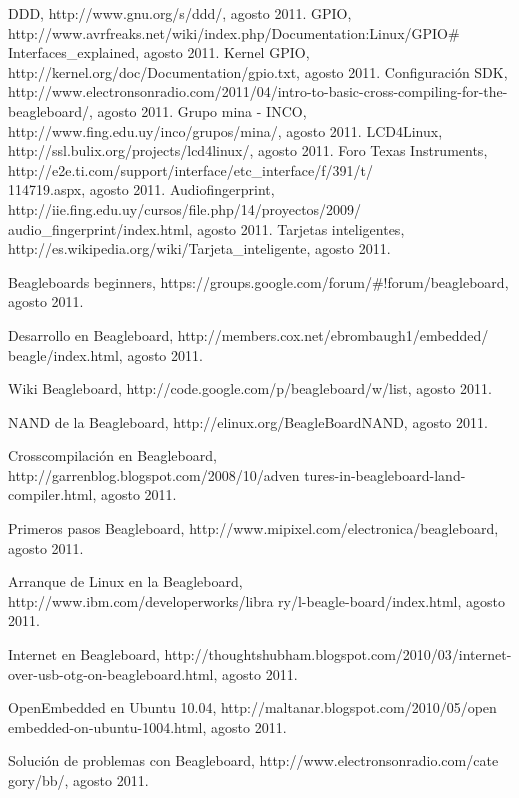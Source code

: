 \begin{thebibliography}{200}
 DDD, http://www.gnu.org/s/ddd/, agosto 2011.
 GPIO, http://www.avrfreaks.net/wiki/index.php/Documentation:Linux/GPIO\#
Interfaces\_explained, agosto 2011.
 Kernel GPIO, http://kernel.org/doc/Documentation/gpio.txt, agosto 2011.
 Configuración SDK, http://www.electronsonradio.com/2011/04/intro-to-basic-cross-compiling-for-the-beagleboard/, agosto 2011.
 Grupo mina - INCO, http://www.fing.edu.uy/inco/grupos/mina/, agosto 2011.
 LCD4Linux, http://ssl.bulix.org/projects/lcd4linux/, agosto 2011.
 Foro Texas Instruments, http://e2e.ti.com/support/interface/etc\_interface/f/391/t/\\
114719.aspx, agosto 2011.
 Audiofingerprint, http://iie.fing.edu.uy/cursos/file.php/14/proyectos/2009/\\
audio\_fingerprint/index.html, agosto 2011.
 Tarjetas inteligentes, http://es.wikipedia.org/wiki/Tarjeta\_inteligente, agosto 2011.

\bibitem{} Beagleboards beginners, https://groups.google.com/forum/\#!forum/beagleboard, agosto 2011.

\bibitem{} Desarrollo en Beagleboard, http://members.cox.net/ebrombaugh1/embedded/
beagle/index.html, agosto 2011.

\bibitem{} Wiki Beagleboard, http://code.google.com/p/beagleboard/w/list, agosto 2011.

\bibitem{} NAND de la Beagleboard, http://elinux.org/BeagleBoardNAND, agosto 2011.

\bibitem{} Crosscompilación en Beagleboard, http://garrenblog.blogspot.com/2008/10/adven
tures-in-beagleboard-land-compiler.html, agosto 2011.

\bibitem{} Primeros pasos Beagleboard, http://www.mipixel.com/electronica/beagleboard, agosto 2011.

\bibitem{} Arranque de Linux en la Beagleboard, http://www.ibm.com/developerworks/libra
ry/l-beagle-board/index.html, agosto 2011.

\bibitem{} Internet en Beagleboard, http://thoughtshubham.blogspot.com/2010/03/internet-over-usb-otg-on-beagleboard.html, agosto 2011.

\bibitem{} OpenEmbedded en Ubuntu 10.04, http://maltanar.blogspot.com/2010/05/open
embedded-on-ubuntu-1004.html, agosto 2011.

\bibitem{} Solución de problemas con Beagleboard, http://www.electronsonradio.com/cate
gory/bb/, agosto 2011.


\end{thebibliography}
